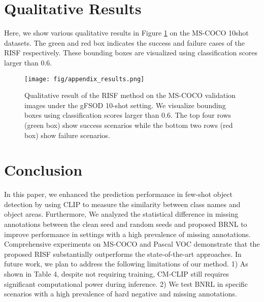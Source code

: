\documentclass{article}
\begin{document}
\section{Qualitative Results}

Here, we show various qualitative results in Figure  \ref{fig:qualitative} on the MS-COCO 10shot datasets.
The green and red box indicates the success and failure cases of the RISF respectively.
These bounding boxes are visualized using classification scores larger than 0.6.



\begin{figure}[hbt!]
    \centering
    \texttt{[image: fig/appendix\_results.png]}
    \caption{Qualitative result of the RISF method on the MS-COCO validation images under the gFSOD 10-shot setting. 
    We visualize bounding boxes using classification scores larger than 0.6.
    The top four rows (green box) show success scenarios while the bottom two rows (red box) show failure scenarios.
    }
    \label{fig:qualitative}
\end{figure}



\section{Conclusion}

In this paper, we enhanced the prediction performance in few-shot object detection by using CLIP to measure the similarity between class names and object areas.
Furthermore, We analyzed the statistical difference in missing annotations between the clean seed and random seeds and proposed BRNL to improve performance in settings with a high prevalence of missing annotations.
Comprehensive experiments on MS-COCO and Pascal VOC demonstrate that the proposed RISF substantially outperforms the state-of-the-art approaches.
In future work, we plan to address the following limitations of our method.
1) As shown in Table 4, despite not requiring training, CM-CLIP still requires significant computational power during inference.
2) We test BNRL in specific scenarios with a high prevalence of hard negative and missing annotations. 



\end{document}
